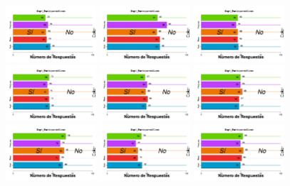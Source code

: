 \begin{figure}[th]
\includegraphics[width=0.30\textwidth]{Figures/BiasColor_Exp1_P10} \includegraphics[width=0.30\textwidth]{Figures/BiasColor_Exp1_P11} \includegraphics[width=0.30\textwidth]{Figures/BiasColor_Exp1_P12}
\includegraphics[width=0.30\textwidth]{Figures/BiasColor_Exp1_P13} \includegraphics[width=0.30\textwidth]{Figures/BiasColor_Exp1_P14} \includegraphics[width=0.30\textwidth]{Figures/BiasColor_Exp1_P15}
\includegraphics[width=0.30\textwidth]{Figures/BiasColor_Exp1_P16} \includegraphics[width=0.30\textwidth]{Figures/BiasColor_Exp1_P17} \includegraphics[width=0.30\textwidth]{Figures/BiasColor_Exp1_P18}

\end{figure}
